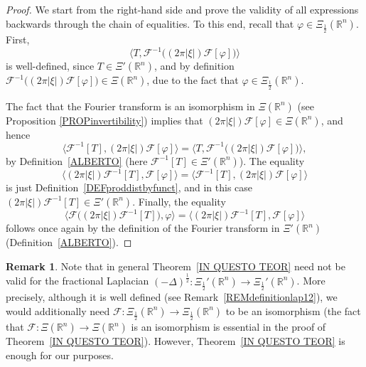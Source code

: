 \documentclass[reqno,11pt]{amsart}
\theoremstyle{definition}
\newtheorem{remark}[theorem]{Remark}
\def\R{\mathbb{R}}
\begin{document}
\begin{proof}
	We start from the right-hand side and prove the validity of all expressions backwards through the chain of equalities. To this end, recall that $\varphi\in \Xi_\frac{1}{2}(\R^n)$. First,
	\[
	 \big\langle T , \mathcal{F}^{-1} \big( (2 \pi |\xi|)\mathcal{F}[\varphi ]\big) \big\rangle
	\]
	is well-defined, since $T\in \Xi'(\R^n)$, and by definition $ \mathcal{F}^{-1} \big( (2 \pi |\xi|)\mathcal{F}[\varphi ]\big)\in \Xi(\R^n)$, due to the fact that $\varphi\in \Xi_\frac{1}{2}(\R^n)$.

The fact that the Fourier transform is an isomorphism in $\Xi(\R^n)$ (see Proposition \ref{PROPinvertibility})
implies that $(2 \pi |\xi|)\mathcal{F}[\varphi ]\in \Xi(\R^n)$, and hence
	\[
	\big\langle \mathcal{F}^{-1}[T] ,(2 \pi |\xi|)\mathcal{F}[\varphi ] \big\rangle=\big\langle T , \mathcal{F}^{-1} \big( (2 \pi |\xi|)\mathcal{F}[\varphi ]\big) \big\rangle,
	\]
	by Definition~\ref{ALBERTO} (here $\mathcal{F}^{-1}[T]\in \Xi'(\R^n)$).  The equality
	\[
	\big\langle (2 \pi |\xi|)\mathcal{F}^{-1}[T] ,\mathcal{F}[\varphi ] \big\rangle=\big\langle \mathcal{F}^{-1}[T] ,(2 \pi  |\xi|)\mathcal{F}[\varphi ] \big\rangle
	\]
	is just Definition~\ref{DEFproddistbyfunct}, and in this case $(2 \pi  |\xi|)\mathcal{F}^{-1}[T] \in \Xi'(\R^n)$. Finally, the equality
	\[
		\big\langle \mathcal{F}\big((2 \pi |\xi|)\mathcal{F}^{-1}[T]\big) ,\varphi  \big\rangle = 	\big\langle (2 \pi  |\xi|)\mathcal{F}^{-1}[T] ,\mathcal{F}[\varphi ] \big\rangle
	\]
	follows once again by the definition of the Fourier transform in $\Xi'(\R^n)$ (Definition~\ref{ALBERTO}).
\end{proof}

\begin{remark}
Note that in general Theorem~\ref{IN QUESTO TEOR} need not be valid for the fractional  Laplacian $(-\Delta)^\frac{1}{2}:\Xi_\frac{1}{2}'(\R^n)\to \Xi_\frac{1}{2}'(\R^n)$. More precisely, although it is well defined (see Remark~\ref{REMdefinitionlap12}), we would additionally need $\mathcal{F}:\Xi_\frac{1}{2}(\R^n)\to \Xi_\frac{1}{2}(\R^n)$ to be an isomorphism (the fact that $\mathcal{F}:\Xi(\R^n)\to \Xi(\R^n)$ is an isomorphism is essential in the proof of Theorem~\ref{IN QUESTO TEOR}). However, Theorem~\ref{IN QUESTO TEOR} is enough for our purposes.
\end{remark}
\end{document}
